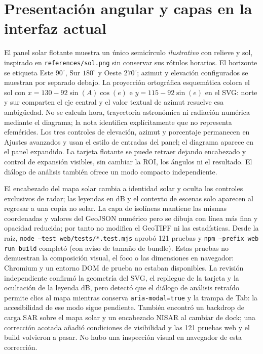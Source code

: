 \documentclass[11pt,a4paper]{article}
\begin{document}
\section{Presentación angular y capas en la interfaz actual}
El panel solar flotante muestra un único semicírculo \emph{ilustrativo} con relieve y sol, inspirado en \texttt{references/sol.png} sin conservar sus rótulos horarios. El horizonte se etiqueta Este $90^\circ$, Sur $180^\circ$ y Oeste $270^\circ$; azimut y elevación configurados se muestran por separado debajo. La proyección ortográfica esquemática coloca el sol con $x=130-92\sin(A)\cos(e)$ e $y=115-92\sin(e)$ en el SVG: norte y sur comparten el eje central y el valor textual de azimut resuelve esa ambigüedad. No se calcula hora, trayectoria astronómica ni radiación numérica mediante el diagrama; la nota identifica explícitamente que no representa efemérides. Los tres controles de elevación, azimut y porcentaje permanecen en Ajustes avanzados y usan el estilo de entradas del panel; el diagrama aparece en el panel expandido. La tarjeta flotante se puede retraer dejando encabezado y control de expansión visibles, sin cambiar la ROI, los ángulos ni el resultado. El diálogo de análisis también ofrece un modo compacto independiente.\par
El encabezado del mapa solar cambia a identidad solar y oculta los controles exclusivos de radar; las leyendas en dB y el contexto de escenas solo aparecen al regresar a una copia no solar. La capa de isolíneas mantiene las mismas coordenadas y valores del GeoJSON numérico pero se dibuja con línea más fina y opacidad reducida; por tanto no modifica el GeoTIFF ni las estadísticas. Desde la raíz, \texttt{node --test web/tests/*.test.mjs} aprobó 121 pruebas y \texttt{npm --prefix web run build} completó (con aviso de tamaño de bundle). Estas pruebas no demuestran la composición visual, el foco o las dimensiones en navegador: Chromium y un entorno DOM de prueba no estaban disponibles. La revisión independiente confirmó la geometría del SVG, el repliegue de la tarjeta y la ocultación de la leyenda dB, pero detectó que el diálogo de análisis retraído permite clics al mapa mientras conserva \texttt{aria-modal=true} y la trampa de Tab: la accesibilidad de ese modo sigue pendiente. También encontró un backdrop de carga SAR sobre el mapa solar y un encabezado NISAR al cambiar de dock; una corrección acotada añadió condiciones de visibilidad y las 121 pruebas web y el build volvieron a pasar. No hubo una inspección visual en navegador de esta corrección.
\end{document}
